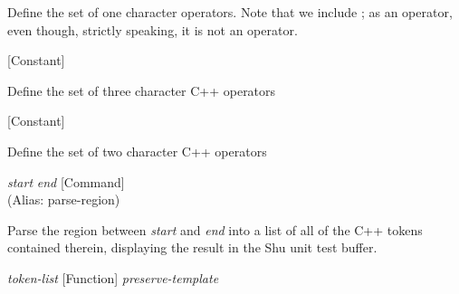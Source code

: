 \begin{doc-string}
Define the set of one character operators.  Note that we include ; as
an operator, even though, strictly speaking, it is not an operator.
\end{doc-string}

\vspace{1em}
\noindent
{}
\usebox{\funcname}
 \hfill [Constant]

\begin{doc-string}
Define the set of three character C++ operators
\end{doc-string}

\vspace{1em}
\noindent
{}
\usebox{\funcname}
 \hfill [Constant]

\begin{doc-string}
Define the set of two character C++ operators
\end{doc-string}

\vspace{1em}
\noindent
{}
\usebox{\funcname}\emph{start} \emph{end}
 \hfill [Command]\\%
 (Alias: parse-region)

\begin{doc-string}
Parse the region between \emph{start} and \emph{end} into a list of all of the C++ tokens
contained therein, displaying the result in the Shu unit test buffer.
\end{doc-string}

\vspace{1em}
\noindent
{}
\usebox{\funcname}\emph{token-list}
 \hfill [Function]
\hspace*{\wd\funcname}\emph{preserve-template}

